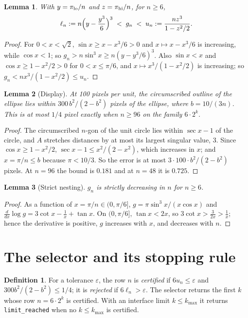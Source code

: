 \documentclass[11pt]{article}
\newtheorem{lemma}{Lemma}
\theoremstyle{definition}
\newtheorem{definition}{Definition}
\theoremstyle{remark}
\begin{document}
\begin{lemma}\label{lem:bounds}
With $y=\pi_{\rm lo}/n$ and $z=\pi_{\rm hi}/n$, for $n\ge 6$,
\[
\ell_n:=n\Bigl(y-\frac{y^3}{6}\Bigr)^3\;<\;g_n\;<\;u_n:=\frac{n z^3}{1-z^2/2}.
\]
\end{lemma}
\begin{proof}
For $0<x<\sqrt2$, $\sin x\ge x-x^3/6>0$ and $x\mapsto x-x^3/6$ is increasing, while $\cos x<1$; so
$g_n>n\sin^3x\ge n(y-y^3/6)^3$. Also $\sin x<x$ and $\cos x\ge 1-x^2/2>0$ for $0<x\le\pi/6$, and
$x\mapsto x^3/(1-x^2/2)$ is increasing; so $g_n<n x^3/(1-x^2/2)\le u_n$.
\end{proof}

\begin{lemma}[Display]\label{lem:display}
At 100 pixels per unit, the circumscribed outline of the ellipse lies within $300\,b^2/(2-b^2)$ pixels of the ellipse,
where $b=10/(3n)$. This is at most $1/4$ pixel exactly when $n\ge 96$ on the family $6\cdot 2^k$.
\end{lemma}
\begin{proof}
The circumscribed $n$-gon of the unit circle lies within $\sec x-1$ of the circle, and $A$ stretches distances by at
most its largest singular value, 3. Since $\cos x\ge 1-x^2/2$, $\sec x-1\le x^2/(2-x^2)$, which increases in $x$; and
$x=\pi/n\le b$ because $\pi<10/3$. So the error is at most $3\cdot100\cdot b^2/(2-b^2)$ pixels. At $n=96$ the bound is
$0.181$ and at $n=48$ it is $0.725$.
\end{proof}

\begin{lemma}[Strict nesting]\label{lem:nest}
$g_n$ is strictly decreasing in $n$ for $n\ge 6$.
\end{lemma}
\begin{proof}
As a function of $x=\pi/n\in(0,\pi/6]$, $g=\pi\sin^3x/(x\cos x)$ and
$\frac{d}{dx}\log g=3\cot x-\frac1x+\tan x$. On $(0,\pi/6]$, $\tan x<2x$, so $3\cot x>\frac{3}{2x}>\frac1x$; hence
the derivative is positive, $g$ increases with $x$, and decreases with $n$.
\end{proof}

\section{The selector and its stopping rule}
\begin{definition}
For a tolerance $\varepsilon$, the row $n$ is \emph{certified} if $6u_n\le\varepsilon$ and
$300b^2/(2-b^2)\le 1/4$; it is \emph{rejected} if $6\ell_n>\varepsilon$. The selector returns the first $k$ whose row
$n=6\cdot2^k$ is certified. With an interface limit $k\le k_{\max}$ it returns \texttt{limit\_reached} when no
$k\le k_{\max}$ is certified.
\end{definition}
\end{document}

